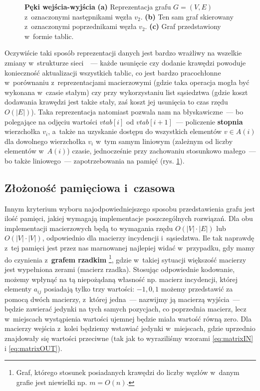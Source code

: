\begin{figure}[!htbp]
\begin{subfigure}[b]{0.50\textwidth}
		\caption{}
	\end{subfigure}
	\caption{\textbf{Pęki wejścia-wyjścia} \textbf{(a)} Reprezentacja grafu $G = \left( V, E \right)$ z~oznaczonymi następnikami węzła $v_{2}$. \textbf{(b)} Ten sam graf skierowany z~oznaczonymi poprzednikami węzła $v_{2}$. \textbf{(c)} Graf przedstawiony w~formie tablic.}\label{fig:forwardReverseStarRepresentation}
\end{figure}

Oczywiście taki sposób reprezentacji danych jest bardzo wrażliwy na wszelkie zmiany w~strukturze sieci~\cite{eCOMPASS_TR_005}~---  każde usunięcie czy dodanie krawędzi powoduje konieczność aktualizacji wszystkich tablic, co jest bardzo pracochłonne w~porównaniu z~reprezentacjami macierzowymi (gdzie taka operacja mogła być wykonana w~czasie stałym) czy przy wykorzystaniu list sąsiedztwa (gdzie koszt dodawania krawędzi jest także stały, zaś koszt jej usunięcia to czas rzędu $ O \left( \left| E \right| \right) $). Taka reprezentacja natomiast pozwala nam na błyskawiczne~---  bo polegające na odjęciu wartości $vtab \left[ i \right] $ od $vtab \left[ i+1 \right] $~---  policzenie \textbf{stopnia} wierzchołka $v_{i}$, a~także na uzyskanie dostępu do wszystkich elementów $ v \in A \left( i \right) $ dla dowolnego wierzchołka $v_{i}$ w~tym samym liniowym (zależnym od liczby elementów w~$A \left( i \right) $) czasie, jednocześnie przy zachowaniu stosunkowo małego~---  bo także liniowego~---  zapotrzebowania na pamięć (rys. \ref{fig:forwardReverseStarRepresentation}).

\subsection{Złożoność pamięciowa i~czasowa}

Innym kryterium wyboru najodpowiedniejszego sposobu przedstawienia grafu jest ilość pamięci, jakiej wymagają implementacje poszczególnych rozwiązań. Dla obu implementacji macierzowych będą to wymagania rzędu $O \left( \left| V \right| \cdot \left| E \right| \right)$ lub $O \left( \left| V \right| \cdot \left| V \right| \right)$, odpowiednio dla macierzy incydencji i~sąsiedztwa. Ile tak naprawdę z~tej pamięci jest przez nas marnowanej najlepiej widać w~przypadku, gdy mamy do czynienia z~\textbf{grafem rzadkim} \footnote{Graf, którego stosunek posiadanych krawędzi do liczby węzłów w~danym grafie jest niewielki np. $m = O \left( n \right)$.}, gdzie w~takiej sytuacji większość macierzy jest wypełniona zerami (macierz rzadka). Stosując odpowiednie kodowanie, możemy wpłynąć na tą niepożądaną własność np. macierz incydencji, której elementy $a_{ij}$ posiadają tylko trzy wartości: $-1, 0, 1$ możemy przedstawić za pomocą dwóch macierzy, z~której jedna~---  nazwijmy ją macierzą wyjścia~---  będzie zawierać jedynki na tych samych pozycjach, co poprzednia macierz, lecz w~miejscach wystąpienia wartości ujemnej będzie miała wartość równą zero. Dla macierzy wejścia z~kolei będziemy wstawiać jedynki w~miejscach, gdzie uprzednio znajdowały się wartości przeciwne (tak jak to wyraziliśmy wzorami \ref{eq:matrixIN} i \ref{eq:matrixOUT}).

